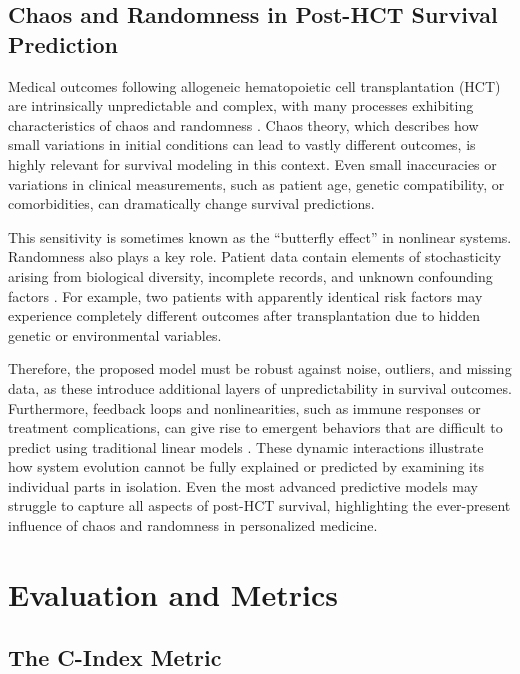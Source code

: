 \subsection{Chaos and Randomness in Post-HCT Survival Prediction}

Medical outcomes following allogeneic hematopoietic cell transplantation (HCT) are intrinsically unpredictable and complex, with many processes exhibiting characteristics of chaos and randomness \cite{frontiers_ai_hct}. Chaos theory, which describes how small variations in initial conditions can lead to vastly different outcomes, is highly relevant for survival modeling in this context. Even small inaccuracies or variations in clinical measurements, such as patient age, genetic compatibility, or comorbidities, can dramatically change survival predictions.

\vspace{0.3cm}

This sensitivity is sometimes known as the ``butterfly effect'' in nonlinear systems. Randomness also plays a key role. Patient data contain elements of stochasticity arising from biological diversity, incomplete records, and unknown confounding factors \cite{biorxiv_autoimmune}. For example, two patients with apparently identical risk factors may experience completely different outcomes after transplantation due to hidden genetic or environmental variables.

\vspace{0.3cm}

Therefore, the proposed model must be robust against noise, outliers, and missing data, as these introduce additional layers of unpredictability in survival outcomes. Furthermore, feedback loops and nonlinearities, such as immune responses or treatment complications, can give rise to emergent behaviors that are difficult to predict using traditional linear models \cite{frontiers_immunology}. These dynamic interactions illustrate how system evolution cannot be fully explained or predicted by examining its individual parts in isolation. Even the most advanced predictive models may struggle to capture all aspects of post-HCT survival, highlighting the ever-present influence of chaos and randomness in personalized medicine.

\section{Evaluation and Metrics}

\subsection{The C-Index Metric}

